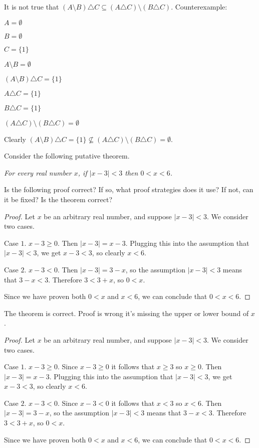 It is not true that $(A \setminus B) \triangle C \subseteq (A \triangle C)
    \setminus (B \triangle C)$. Counterexample:

$A = \emptyset$

$B = \emptyset$

$C = \{1\}$

$A \setminus B = \emptyset$

$(A \setminus B) \triangle C = \{1\}$

$A \triangle C = \{1\}$

$B \triangle C = \{1\}$

$(A \triangle C) \setminus (B \triangle C) = \emptyset$

Clearly $(A \setminus B) \triangle C = \{1\} \not \subseteq (A \triangle C)
    \setminus (B \triangle C) = \emptyset$.

\begin{tcolorbox}[title=Problem 27, breakable]
    Consider the following putative theorem.

     \emph{For every real number $x$, if $|x - 3| < 3$ then $0 < x < 6$.}

    Is the following proof correct? If so, what proof strategies does it use? If
    not, can it be fixed? Is the theorem correct?

    \begin{proof}
        Let $x$ be an arbitrary real number, and suppose $|x - 3| < 3$. We consider
        two cases.

        Case $1$. $x - 3 \ge 0$. Then $|x - 3| = x - 3$. Plugging this into the
        assumption that $|x - 3| < 3$, we get $x - 3 < 3$, so clearly $x < 6$.

        Case $2$. $x - 3 < 0$. Then $|x - 3| = 3 - x$, so the assumption $|x - 3| < 3$
        means that $3 - x < 3$. Therefore $3 < 3 + x$, so $0 < x$.

        Since we have proven both $0 < x$ and $x < 6$, we can conclude that $0 < x <
            6$.
    \end{proof}
\end{tcolorbox}

The theorem is correct. Proof is wrong it's missing the upper or lower bound of
$x$.

\begin{proof}
    Let $x$ be an arbitrary real number, and suppose $|x - 3| < 3$. We consider
    two cases.

    Case $1$. $x - 3 \ge 0$. Since $x - 3 \ge 0$ it follows that $x \ge 3$ so $x
        \ge 0$. Then $|x - 3| = x - 3$. Plugging this into the assumption that $|x - 3|
        < 3$, we get $x - 3 < 3$, so clearly $x < 6$.

    Case $2$. $x - 3 < 0$. Since $x - 3 < 0$ it follows that $x < 3$ so $x < 6$.
    Then $|x - 3| = 3 - x$, so the assumption $|x - 3| < 3$ means that $3 - x < 3$.
    Therefore $3 < 3 + x$, so $0 < x$.

    Since we have proven both $0 < x$ and $x < 6$, we can conclude that $0 < x <
        6$.
\end{proof}

